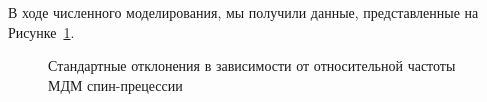 В ходе численного моделирования, мы получили данные, представленные на Рисунке~\ref{fig:sd}. 
\begin{figure}[H]\centering
\end{figure}
\begin{figure}[H]\centering
	\caption{Стандартные отклонения в зависимости от относительной частоты МДМ спин-прецессии\label{fig:sd}}
\end{figure}

